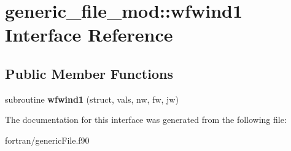 \hypertarget{interfacegeneric__file__mod_1_1wfwind1}{}\section{generic\+\_\+file\+\_\+mod\+:\+:wfwind1 Interface Reference}
\label{interfacegeneric__file__mod_1_1wfwind1}
\subsection*{Public Member Functions}
\begin{DoxyCompactItemize}
\item 
\mbox{\label{interfacegeneric__file__mod_1_1wfwind1_a343f900334dd1385cf2d2a138ef753d6}} 
subroutine {\bfseries wfwind1} (struct, vals, nw, fw, jw)
\end{DoxyCompactItemize}


The documentation for this interface was generated from the following file\+:\begin{DoxyCompactItemize}
\item 
fortran/generic\+File.\+f90\end{DoxyCompactItemize}
